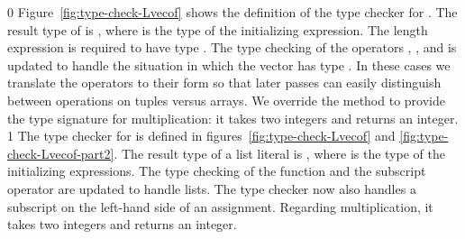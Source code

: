 \documentclass[7x10]{TimesAPriori_MIT}%
\def\racketEd{0}
\def\pythonEd{1}
\providecommand{\BookEdition}{1}
\let\edition\BookEdition
\newcommand{\pythonColor}[0]{}
\numberwithin{theorem}{chapter}
\numberwithin{definition}{chapter}
\numberwithin{equation}{chapter}
\begin{document}
{\if\edition\racketEd
%
Figure~\ref{fig:type-check-Lvecof} shows the definition of the type
checker for \LangArray{}. The result type of
 is , where  is the type
of the initializing expression.  The length expression is required to
have type . The type checking of the operators
, , and   is
updated to handle the situation in which the vector has type
. In these cases we translate the operators to their
 form so that later passes can easily distinguish
between operations on tuples versus arrays. We override the
 method to provide the type signature for
multiplication: it takes two integers and returns an integer.
\fi}
%
{\if\edition\pythonEd\pythonColor
%
The type checker for \LangArray{} is defined in
figures~\ref{fig:type-check-Lvecof} and
\ref{fig:type-check-Lvecof-part2}. The result type of a list literal
is , where  is the type of the initializing
expressions.  The type checking of the  function and the
subscript operator are updated to handle lists. The type checker now
also handles a subscript on the left-hand side of an assignment.
Regarding multiplication, it takes two integers and returns an
integer.
%
\fi}
\end{document}
